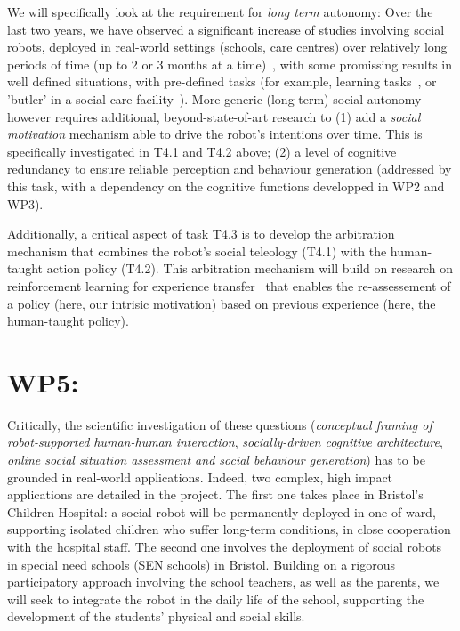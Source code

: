 \documentclass[11pt,a4paper]{report}
\begin{document}
We will specifically look at the requirement for \emph{long term} autonomy: Over
the last two years, we have observed a significant increase of studies
involving social robots, deployed in real-world settings (schools, care centres)
over relatively long periods of time (up to 2 or 3 months at a
time)~\cite{kunze2018artificial,leite2013social}, with some promissing results
in well defined situations, with pre-defined tasks (for example, learning
tasks~\cite{senft2019teaching}, or 'butler' in a social care
facility~\cite{hawes2017strands}). More generic (long-term) social autonomy
however requires additional, beyond-state-of-art research to (1) add a
\emph{social motivation} mechanism able to drive the robot's intentions over
time. This is specifically investigated in T4.1 and T4.2 above; (2) a level of
cognitive redundancy to ensure reliable perception and behaviour generation
(addressed by this task, with a dependency on the cognitive functions developped
in WP2 and WP3).

Additionally, a critical aspect of task T4.3 is to develop the arbitration
mechanism that combines the robot's social teleology (T4.1) with the human-taught
action policy (T4.2). This arbitration mechanism will build on research on
reinforcement learning for experience transfer~\cite{madden2004transfer} that
enables the re-assessement of a policy (here, our intrisic motivation) based on
previous experience (here, the human-taught policy).




\section{WP5: \textbf{\wpFive}}

\noindent{}





Critically, the scientific investigation of these questions (\emph{conceptual
framing of robot-supported human-human interaction}, \emph{socially-driven
cognitive architecture},  \emph{online social situation assessment and social
behaviour generation}) has to be
grounded in real-world applications. Indeed, two complex, high impact
applications are detailed in the project. The first one takes place in
Bristol's Children Hospital: a social robot will be permanently deployed in one
of ward, supporting isolated children who suffer long-term conditions, in close
cooperation with the hospital staff. The second one involves the deployment of 
social robots in special need schools (SEN schools) in Bristol. Building on a
rigorous participatory approach involving the school teachers, as well as the
parents, we will seek to integrate the robot in the daily life of the school,
supporting the development of the students' physical and social skills.
\end{document}
